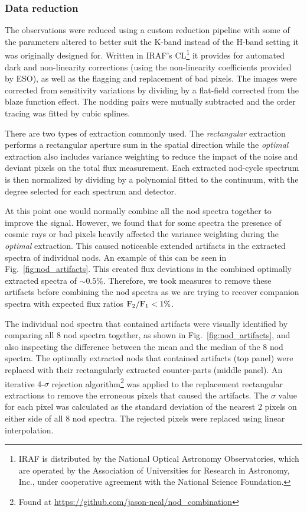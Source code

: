 \subsubsection{Data reduction}
\label{subsubsec:reduction}
The observations were reduced using a custom reduction pipeline \citep{figueira_radial_2010} with some of the parameters altered to better suit the K-band instead of the H-band setting it was originally designed for. Written in IRAF's CL\footnote{IRAF is distributed by the National Optical Astronomy Observatories, which are operated by the Association of Universities for Research in Astronomy, {Inc.}, under cooperative agreement with the National Science Foundation.} \citep{tody_iraf_1993} it provides for automated dark and non-linearity corrections (using the non-linearity coefficients provided by ESO), as well as the flagging and replacement of bad pixels. The images were corrected from sensitivity variations by dividing by a flat-field corrected from the blaze function effect. The nodding pairs were mutually subtracted and the order tracing was fitted by cubic splines.  

There are two types of extraction commonly used. The \emph{rectangular} extraction performs a rectangular aperture sum in the spatial direction while the \emph{optimal} extraction \citep{horne_optimal_1986} also includes variance weighting to reduce the impact of the noise and deviant pixels on the total flux measurement. Each extracted nod-cycle spectrum is then normalized by dividing by a polynomial fitted to the continuum, with the degree selected for each spectrum and detector.

At this point one would normally combine all the nod spectra together to improve the signal. However, we found that for some spectra the presence of cosmic rays or bad pixels heavily affected the variance weighting during the \emph{optimal} extraction. This caused noticeable extended artifacts in the extracted spectra of individual nods. An example of this can be seen in Fig.~\ref{fig:nod_artifacts}. This created flux deviations in the combined optimally extracted spectra of \(\sim 0.5\% \).  Therefore, we took measures to remove these artifacts before combining the nod spectra as we are trying to recover companion spectra with expected flux ratios \(\rm {F_2}/{F_1} < 1\% \). 

The individual nod spectra that contained artifacts were visually identified by comparing all 8 nod spectra together, as shown in Fig.~\ref{fig:nod_artifacts}, and also inspecting the difference between the mean and the median of the 8 nod spectra. The optimally extracted nods that contained artifacts (top panel) were replaced with their rectangularly extracted counter-parts (middle panel). An iterative 4-\(\sigma \) rejection algorithm\footnote{Found at \url{https://github.com/jason-neal/nod_combination}} was applied to the replacement rectangular extractions to remove the erroneous pixels that caused the artifacts. The \(\sigma\) value for each pixel was calculated as the standard deviation of the nearest 2 pixels on either side of all 8 nod spectra. The rejected pixels were replaced using linear interpolation.

